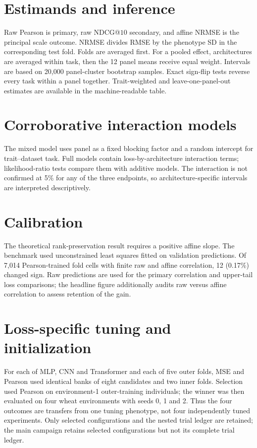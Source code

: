 \documentclass[10pt]{article}
\begin{document}
\section{Estimands and inference}
Raw Pearson is primary, raw NDCG@$10$ secondary, and affine NRMSE is the principal
scale outcome. NRMSE divides RMSE by the phenotype SD in the corresponding test
fold. Folds are averaged first. For a pooled effect, architectures are averaged
within task, then the 12 panel means receive equal weight. Intervals are based on
20,000 panel-cluster bootstrap samples. Exact sign-flip tests reverse every task
within a panel together. Trait-weighted and leave-one-panel-out estimates are
available in the machine-readable table.




\section{Corroborative interaction models}
The mixed model uses panel as a fixed blocking factor and a random intercept for
trait--dataset task. Full models contain loss-by-architecture interaction terms;
likelihood-ratio tests compare them with additive models. The interaction is not
confirmed at 5\% for any of the three endpoints, so architecture-specific
intervals are interpreted descriptively.



\section{Calibration}
The theoretical rank-preservation result requires a positive affine slope. The
benchmark used unconstrained least squares fitted on validation predictions. Of
7,014 Pearson-trained fold cells with finite raw and affine correlation, 12
(0.17\%) changed sign. Raw predictions are used for the primary correlation and upper-tail
loss comparisons; the headline figure additionally audits raw versus affine
correlation to assess retention of the gain.



\section{Loss-specific tuning and initialization}
For each of MLP, CNN and Transformer and each of five outer folds, MSE and
Pearson used identical banks of eight candidates and two inner folds. Selection
used Pearson on environment-1 outer-training individuals; the winner was then
evaluated on four wheat environments with seeds 0, 1 and 2. Thus the four
outcomes are transfers from one tuning phenotype, not four independently tuned
experiments. Only selected configurations and the nested trial ledger are
retained; the main campaign retains selected configurations but not its complete
trial ledger.
\end{document}
